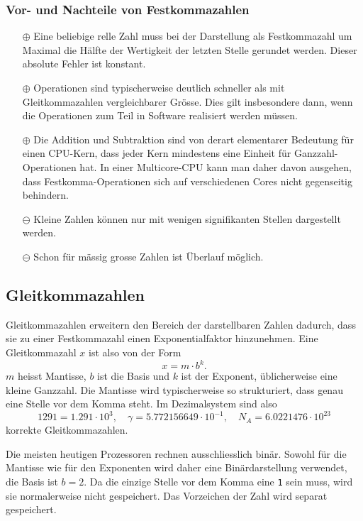 \subsubsection{Vor- und Nachteile von Festkommazahlen}
\begin{itemize}
\item[$\oplus$]
Eine beliebige relle Zahl muss bei der Darstellung als Festkommazahl
um Maximal die Hälfte der Wertigkeit der letzten Stelle gerundet werden.
Dieser absolute Fehler ist konstant.
\item[$\oplus$]
Operationen sind typischerweise deutlich schneller als
mit Gleitkommazahlen vergleichbarer Grösse.
Dies gilt insbesondere dann, wenn die Operationen zum Teil in Software 
realisiert werden müssen.
\item[$\oplus$] Die Addition und Subtraktion sind von derart elementarer
Bedeutung für einen CPU-Kern, dass jeder Kern mindestens eine Einheit
für Ganzzahl-Operationen hat.
In einer Multicore-CPU kann man daher davon ausgehen, dass Festkomma-Operationen
sich auf verschiedenen Cores nicht gegenseitig behindern.
\item[$\ominus$] Kleine Zahlen können nur mit wenigen signifikanten
Stellen dargestellt werden.
\item[$\ominus$] Schon für mässig grosse Zahlen ist Überlauf möglich.
\end{itemize}

%
%
\subsection{Gleitkommazahlen
\label{buch:subsection:floatinpoing}}
Gleitkommazahlen erweitern den Bereich der darstellbaren Zahlen dadurch,
dass sie zu einer Festkommazahl einen Exponentialfaktor hinzunehmen.
Eine Gleitkommazahl $x$ ist also von der Form
\[
x = m \cdot b^k.
\]
$m$ heisst Mantisse, $b$ ist die Basis und $k$ ist der
Exponent, üblicherweise eine kleine Ganzzahl.
Die Mantisse wird typischerweise so strukturiert, dass genau eine 
Stelle vor dem Komma steht.
Im Dezimalsystem sind also
\[
1291
=
1.291\cdot 10^{3},
\quad
\gamma = 5.772156649\cdot 10^{-1},
\quad
N_A
=
6.0221476\cdot 10^{23}
\]
korrekte Gleitkommazahlen.

Die meisten heutigen Prozessoren rechnen ausschliesslich binär.
Sowohl für die Mantisse wie für den Exponenten wird daher eine
Binärdarstellung verwendet, die Basis ist $b=2$.
Da die einzige Stelle vor dem Komma eine \texttt{1} sein muss, wird
sie normalerweise nicht gespeichert.
Das Vorzeichen der Zahl wird separat gespeichert.


